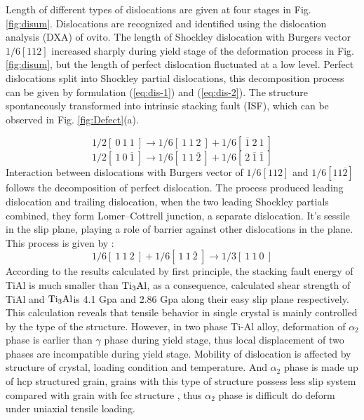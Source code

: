 \documentclass[materials,article,submit,moreauthors,pdftex,10pt,a4paper]{Definitions/mdpi}
\begin{document}
Length of different types of dislocations are given at four stages in Fig. \ref{fig:disum}. Dislocations are recognized and identified using the dislocation analysis (DXA) of ovito. The length of Shockley dislocation with Burgers vector $1/6[1 1 2]$ increased sharply during yield stage of the deformation process in Fig. \ref{fig:disum}, but the length of perfect dislocation fluctuated at a low level. Perfect  dislocations split into Shockley partial dislocations, this decomposition process  can be given by formulation (\ref{eq:dis-1}) and (\ref{eq:dis-2}). The structure spontaneously transformed into intrinsic stacking fault (ISF), which can be observed in Fig. \ref{fig:Defect}(a). 


\begin{equation}\label{eq:dis-1}
1/2 [\ 0\ 1\ 1\ ] \to 1/6[\ 1\ 1\ 2\ ]+1/6[\ \overline{1}\ 2\ 1\ ]
\end{equation}
\begin{equation}\label{eq:dis-2}
1/2 [\ 1\ 0\ \overline{1}\ ] \to 1/6 [\ 1\ 1\ \overline{2}\ ] + 1/6[\ 2\ \overline{1}\ \overline{1}\ ]
\end{equation}
Interaction between dislocations with Burgers vector of $1/6 [112] $ and $ 1/6 [11\overline{2}]$ follows the decomposition of perfect dislocation. The process produced leading dislocation and trailing dislocation, when the two leading Shockley partials combined, they form Lomer–Cottrell junction, a separate dislocation. It's sessile in the slip plane, playing a role of barrier against other dislocations in the plane. This process is given by :
\begin{equation}\label{eq:dis-3}
1/6 [\ 1\ 1\ 2\ ] + 1/6 [\ 1\ 1\  \overline{2}\ ] \to 1/3 [\ 1\ 1\ 0\ ]
\end{equation}
According to the  results calculated by first principle, the stacking fault energy of TiAl is much smaller than $\rm{Ti_3Al}$, as a consequence, calculated shear strength of TiAl and $\rm{Ti_3Al}$is 4.1 Gpa and 2.86 Gpa along their easy slip plane respectively\cite{Liu2007}. This calculation reveals that tensile behavior in single crystal is mainly controlled by the type of the structure. However, in two phase Ti-Al alloy, deformation of $\alpha_2$ phase is earlier than $\gamma$ phase during yield stage, thus local displacement of two phases are incompatible during yield stage.  Mobility of dislocation is affected by structure of crystal, loading condition and temperature. And $\alpha_2$ phase is made up of hcp  structured grain, grains with this type of structure possess less slip system compared with grain with fcc structure \cite{Zhu2012}, thus $\alpha_2$ phase is difficult do deform under uniaxial tensile loading. 
\end{document}
